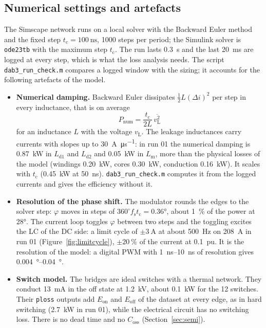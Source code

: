 \documentclass[12pt,a4paper]{scrartcl}
\newcommand{\ped}[1]{_{\mathrm{#1}}}
\newcommand{\code}[1]{\texttt{#1}}
\begin{document}
\begin{onehalfspace}
\subsection{Numerical settings and artefacts}
\label{sec:numerics}

The Simscape network runs on a local solver with the Backward Euler method \cite{mathworks_solver} and the fixed step $t\ped{c} = \SI{100}{\nano\second}$, 1000 steps per period; the Simulink solver is \code{ode23tb} with the maximum step $t\ped{c}$. The run lasts \SI{0.3}{\second} and the last \SI{20}{\milli\second} are logged at every step, which is what the loss analysis needs. The script \code{dab3\_run\_check.m} compares a logged window with the sizing; it accounts for the following artefacts of the model.
\begin{itemize}[nosep]
	\item \textbf{Numerical damping.} Backward Euler dissipates $\frac{1}{2} L (\Delta i)^2$ per step in every inductance, that is on average
	\begin{equation}
		P\ped{num} = \frac{t\ped{c}}{2L}\,\overline{v\ped{L}^2}
		\label{eq:pnum}
	\end{equation}
	for an inductance $L$ with the voltage $v\ped{L}$. The leakage inductances carry currents with slopes up to \SI{30}{\ampere\per\micro\second}: in run 01 the numerical damping is \SI{0.87}{\kilo\watt} in $L\ped{d1}$ and $L\ped{d2}$ and \SI{0.05}{\kilo\watt} in $L\ped{m}$, more than the physical losses of the model (windings \SI{0.20}{\kilo\watt}, cores \SI{0.30}{\kilo\watt}, conduction \SI{0.16}{\kilo\watt}). It scales with $t\ped{c}$ (\SI{0.45}{\kilo\watt} at \SI{50}{\nano\second}). \code{dab3\_run\_check.m} computes it from the logged currents and gives the efficiency without it.
	\item \textbf{Resolution of the phase shift.} The modulator rounds the edges to the solver step: $\varphi$ moves in steps of $360^\circ f\ped{s} t\ped{c} = \ang{0.36}$, about \SI{1}{\percent} of the power at \ang{28}. The current loop toggles $\varphi$ between two steps and the toggling excites the LC of the DC side: a limit cycle of $\pm\SI{3}{\ampere}$ at about \SI{500}{\hertz} on \SI{208}{\ampere} in run 01 (Figure~\ref{fig:limitcycle}), $\pm\SI{20}{\percent}$ of the current at \SI{0.1}{pu}. It is the resolution of the model: a digital PWM with \SIrange{1}{10}{\nano\second} of resolution gives \SIrange{0.004}{0.04}{\degree}.
	\item \textbf{Switch model.} The bridges are ideal switches with a thermal network. They conduct \SI{13}{\milli\ampere} in the off state at \SI{1.2}{\kilo\volt}, about \SI{0.1}{\kilo\watt} for the 12 switches. Their \code{ploss} outputs add $E\ped{on}$ and $E\ped{off}$ of the dataset at every edge, as in hard switching (\SI{2.7}{\kilo\watt} in run 01), while the electrical circuit has no switching loss. There is no dead time and no $C\ped{oss}$ (Section~\ref{sec:semi}).

\end{itemize}
\end{onehalfspace}
\end{document}
